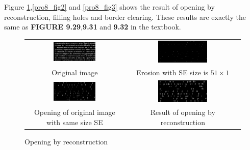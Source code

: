 \documentclass[11pt,a4paper]{article}
\begin{document}
Figure \ref{pro8_fig1},\ref{pro8_fig2} and \ref{pro8_fig3} shows the result of opening by reconstruction,
filling holes and border clearing. These results are exactly the same as \textbf{FIGURE 9.29},\textbf{9.31} and
\textbf{9.32} in the textbook.

\begin{figure}[!htbp]
	\centering
	\begin{tabular}{cc} 
		\includegraphics[width=0.45\textwidth]{pro8/9_29_a}&
		\includegraphics[width=0.45\textwidth]{pro8/9_29_b}\\
		Original image &Erosion with SE size is $51\times 1$ \\
		\includegraphics[width=0.45\textwidth]{pro8/9_29_c}&
		\includegraphics[width=0.45\textwidth]{pro8/9_29_d}\\
		Opening of original image with same size SE & Result of opening by reconstruction
	\end{tabular}
	\caption{Opening by reconstruction}
	\label{pro8_fig1}
\end{figure}
\end{document}
